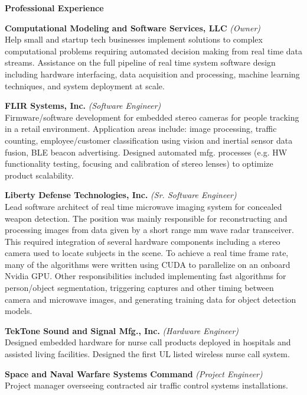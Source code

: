 \documentclass[10pt,letterpaper]{article}
\begin{document}
\bigskip
\noindent\textbf{\large{Professional Experience}}

\newcommand{\experience}[4]{
\medskip
\marginnote{\footnotesize{\textit{#1}}}
\noindent\footnotesize{\textbf{#2} \textit{(#3)}}\\
#4
}

\experience{2020}{Computational Modeling and Software Services, LLC}{Owner}{
Help small and startup tech businesses implement solutions to complex computational problems requiring
automated decision making from real time data streams.  Assistance on the full pipeline of real time
system software design including hardware interfacing, data acquisition and processing, machine learning
techniques, and system deployment at scale.
}

\experience{2015-2020}{FLIR Systems, Inc.}{Software Engineer}{
Firmware/software development for embedded stereo cameras
for people tracking in a retail environment. Application areas include: image processing, traffic counting,
employee/customer classification using vision and inertial sensor data fusion, BLE beacon advertising.
Designed automated mfg. processes (e.g. HW functionality testing, focusing and calibration of stereo
lenses) to optimize product scalability.
}

\experience{2019}{Liberty Defense Technologies, Inc.}{Sr. Software Engineer}{
Lead software architect of real time microwave imaging system for concealed weapon detection. The position
was mainly responsible for reconstructing and processing images from data given by a short range mm wave radar
transceiver. This required integration of several hardware components including a stereo camera used to locate
subjects in the scene.  To achieve a real time frame rate, many of the algorithms were written using CUDA to
parallelize on an onboard Nvidia GPU.  Other responsibilities included implementing fast algorithms for
person/object segmentation, triggering captures and other timing between camera and microwave images, and
generating training data for object detection models.
}

\experience{2010-2013}{TekTone Sound and Signal Mfg., Inc.}{Hardware Engineer}{
Designed embedded hardware for nurse call products deployed in
hospitals and assisted living facilities.  Designed the first UL listed wireless nurse call system.
}

\experience{2010}{Space and Naval Warfare Systems Command}{Project Engineer}{
Project manager overseeing contracted air traffic control systems installations.
}
\end{document}
